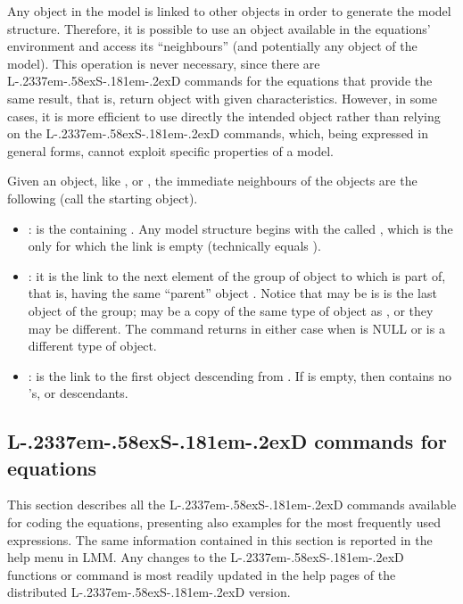 \documentclass [11pt,a4paper] {book}
\def\LsD{{L\kern-.2337em\lower-.58ex\hbox{S}\kern-.181em\lower-.2ex\hbox{D}}\xspace}
\begin{document}
Any object in the model is linked to other objects in order to generate the model structure. Therefore, it is possible to use an object available in the equations' environment and access its ``neighbours'' (and potentially any object of the model). This operation is never necessary, since there are \LsD commands for the equations that provide the same result, that is, return object with given characteristics. However, in some cases, it is more efficient to use directly the intended object rather than relying on the \LsD commands, which, being expressed in general forms, cannot exploit specific properties of a model.

Given an object, like ,  or , the immediate neighbours of the objects are the following (call  the starting object).

\begin{itemize}
 \item {}: is the  containing . Any model
 structure begins with the  called , which is the only
  for which the link  is empty (technically equals ).
 \item {}: it is the link to the next element of the group of object to which
  is part of, that is, having the same ``parent'' object . Notice that   may be  is  is the last object of the group;  may be a copy of the same type of object as , or they may be different. The command  returns  in either case when  is NULL or is a different type of object.
  \item {}: is the link to the first object descending from
 . If  is empty, then  contains no 's,
 or descendants.

\end{itemize}


\subsection{\LsD commands for equations}
This section describes all the \LsD commands available for coding the equations, presenting also examples for the most frequently used expressions. The same information contained in this section is reported in the help menu in LMM. Any changes to the \LsD functions or command is most readily updated in the help pages of the distributed \LsD version.
\end{document}
